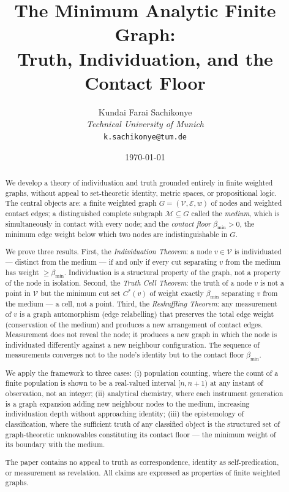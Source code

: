 \documentclass[12pt, a4paper]{article}
\title{\textbf{The Minimum Analytic Finite Graph:\\
Truth, Individuation, and the Contact Floor}}
\author{Kundai Farai Sachikonye\\
\textit{Technical University of Munich}\\
\texttt{k.sachikonye@tum.de}}
\date{\today}
\theoremstyle{plain}
\theoremstyle{definition}
\theoremstyle{remark}
\newcommand{\med}{\mathcal{M}}
\newcommand{\Ecal}{\mathcal{E}}
\newcommand{\Vcal}{\mathcal{V}}
\newcommand{\bmin}{\beta_{\min}}
\begin{document}
\maketitle

\begin{abstract}

We develop a theory of individuation and truth grounded entirely in finite
weighted graphs, without appeal to set-theoretic identity, metric spaces, or
propositional logic. The central objects are: a finite weighted graph
$G = (\Vcal, \Ecal, w)$ of nodes and weighted contact edges; a distinguished
complete subgraph $\med \subseteq G$ called the \emph{medium}, which is
simultaneously in contact with every node; and the \emph{contact floor}
$\bmin > 0$, the minimum edge weight below which two nodes are
indistinguishable in $G$.

We prove three results. First, the \emph{Individuation Theorem}: a node $v
\in \Vcal$ is individuated --- distinct from the medium --- if and only if
every cut separating $v$ from the medium has weight $\geq \bmin$. Individuation
is a structural property of the graph, not a property of the node in isolation.
Second, the \emph{Truth Cell Theorem}: the truth of a node $v$ is not a
point in $\Vcal$ but the minimum cut set $C^*(v)$ of weight exactly $\bmin$
separating $v$ from the medium --- a cell, not a point. Third, the
\emph{Reshuffling Theorem}: any measurement of $v$ is a graph automorphism
(edge relabelling) that preserves the total edge weight (conservation of the
medium) and produces a new arrangement of contact edges. Measurement does not
reveal the node; it produces a new graph in which the node is individuated
differently against a new neighbour configuration. The sequence of measurements
converges not to the node's identity but to the contact floor $\bmin$.

We apply the framework to three cases: (i) population counting, where the
count of a finite population is shown to be a real-valued interval
$[n, n+1)$ at any instant of observation, not an integer; (ii) analytical
chemistry, where each instrument generation is a graph expansion adding new
neighbour nodes to the medium, increasing individuation depth without
approaching identity; (iii) the epistemology of classification, where the
sufficient truth of any classified object is the structured set of
graph-theoretic unknowables constituting its contact floor --- the minimum
weight of its boundary with the medium.

The paper contains no appeal to truth as correspondence, identity as
self-predication, or measurement as revelation. All claims are expressed
as properties of finite weighted graphs.

\end{abstract}
\end{document}
